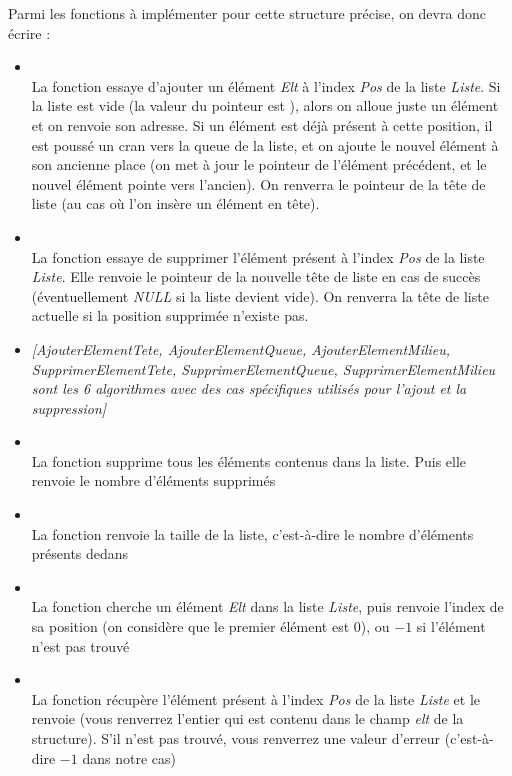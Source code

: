 \documentclass[11pt,a4paper]{article}
\begin{document}
\medskip

Parmi les fonctions à implémenter pour cette structure précise, on devra donc écrire :

\begin{itemize}
\item {}\\
      La fonction essaye d'ajouter un élément \textit{Elt} à l'index \textit{Pos} de la liste \textit{Liste}. Si la liste est vide (la valeur du pointeur est ), alors on alloue juste un élément et on renvoie son adresse. Si un élément est déjà présent à cette position, il est poussé un cran vers la queue de la liste, et on ajoute le nouvel élément à son ancienne place (on met à jour le pointeur de l'élément précédent, et le nouvel élément pointe vers l'ancien). On renverra le pointeur de la tête de liste (au cas où l'on insère un élément en tête).
\item {}\\
      La fonction essaye de supprimer l'élément présent à l'index \textit{Pos} de la liste \textit{Liste}. Elle renvoie le pointeur de la nouvelle tête de liste en cas de succès (éventuellement \textit{NULL} si la liste devient vide). On renverra la tête de liste actuelle si la position supprimée n'existe pas.
\item \textit{[AjouterElementTete, AjouterElementQueue, AjouterElementMilieu, SupprimerElementTete, SupprimerElementQueue, SupprimerElementMilieu sont les 6 algorithmes avec des cas spécifiques utilisés pour l'ajout et la suppression]}
\item {}\\
      La fonction supprime tous les éléments contenus dans la liste. Puis elle renvoie le nombre d'éléments supprimés
\item {}\\
      La fonction renvoie la taille de la liste, c'est-à-dire le nombre d'éléments présents dedans
\item {}\\
      La fonction cherche un élément \textit{Elt} dans la liste \textit{Liste}, puis renvoie l'index de sa position (on considère que le premier élément est $ 0 $), ou $ -1 $ si l'élément n'est pas trouvé
\item {}\\
      La fonction récupère l'élément présent à l'index \textit{Pos} de la liste \textit{Liste} et le renvoie (vous renverrez l'entier qui est contenu dans le champ \textit{elt} de la structure). S'il n'est pas trouvé, vous renverrez une valeur d'erreur (c'est-à-dire $ -1 $ dans notre cas)
\end{itemize}
\end{document}
